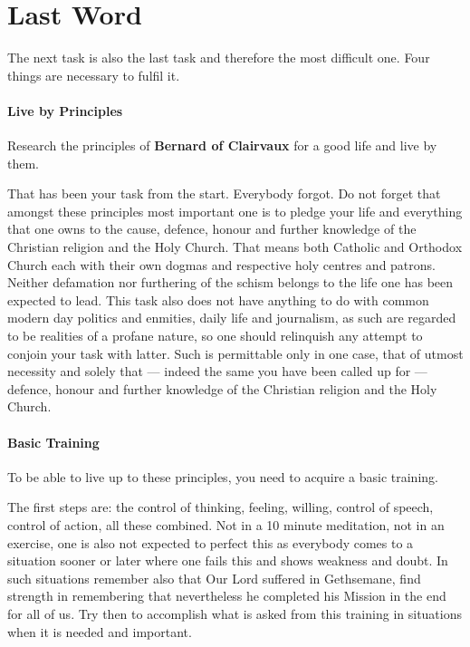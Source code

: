 \section{Last Word}

The next task is also the last task and therefore the most difficult one. Four things are necessary to fulfil it.

\paragraph{Live by Principles}
Research the principles of \textbf{Bernard of Clairvaux} for a good life and live by them.

That has been your task from the start. Everybody forgot. Do not forget that amongst these principles most important one is to pledge your life and everything that one owns to the cause, defence, honour and further knowledge of the Christian religion and the Holy Church. That means both Catholic and Orthodox Church each with their own dogmas and respective holy centres and patrons. Neither defamation nor furthering of the schism belongs to the life one has been expected to lead. This task also does not have anything to do with common modern day politics and enmities, daily life and journalism, as such are regarded to be realities of a profane nature, so one should relinquish any attempt to conjoin your task with latter. Such is permittable only in one case, that of utmost necessity and solely that — indeed the same you have been called up for — defence, honour and further knowledge of the Christian religion and the Holy Church.

\paragraph{Basic Training}
To be able to live up to these principles, you need to acquire a basic training.

The first steps are: the control of thinking, feeling, willing, control of speech, control of action, all these combined. Not in a 10 minute meditation, not in an exercise, one is also not expected to perfect this as everybody comes to a situation sooner or later where one fails this and shows weakness and doubt. In such situations remember also that Our Lord suffered in Gethsemane, find strength in remembering that nevertheless he completed his Mission in the end for all of us. Try then to accomplish what is asked from this training in situations when it is needed and important.

